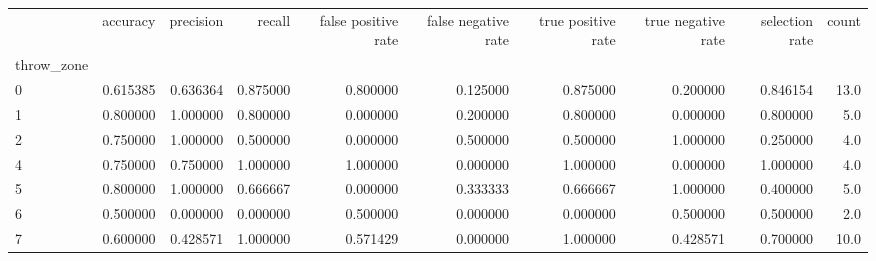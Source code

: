 \begin{tabular}{lrrrrrrrrr}
\toprule
{} &  accuracy &  precision &    recall &  false positive rate &  false negative rate &  true positive rate &  true negative rate &  selection rate &  count \\
throw\_zone &           &            &           &                      &                      &                     &                     &                 &        \\
\midrule
0          &  0.615385 &   0.636364 &  0.875000 &             0.800000 &             0.125000 &            0.875000 &            0.200000 &        0.846154 &   13.0 \\
1          &  0.800000 &   1.000000 &  0.800000 &             0.000000 &             0.200000 &            0.800000 &            0.000000 &        0.800000 &    5.0 \\
2          &  0.750000 &   1.000000 &  0.500000 &             0.000000 &             0.500000 &            0.500000 &            1.000000 &        0.250000 &    4.0 \\
4          &  0.750000 &   0.750000 &  1.000000 &             1.000000 &             0.000000 &            1.000000 &            0.000000 &        1.000000 &    4.0 \\
5          &  0.800000 &   1.000000 &  0.666667 &             0.000000 &             0.333333 &            0.666667 &            1.000000 &        0.400000 &    5.0 \\
6          &  0.500000 &   0.000000 &  0.000000 &             0.500000 &             0.000000 &            0.000000 &            0.500000 &        0.500000 &    2.0 \\
7          &  0.600000 &   0.428571 &  1.000000 &             0.571429 &             0.000000 &            1.000000 &            0.428571 &        0.700000 &   10.0 \\
\bottomrule
\end{tabular}
